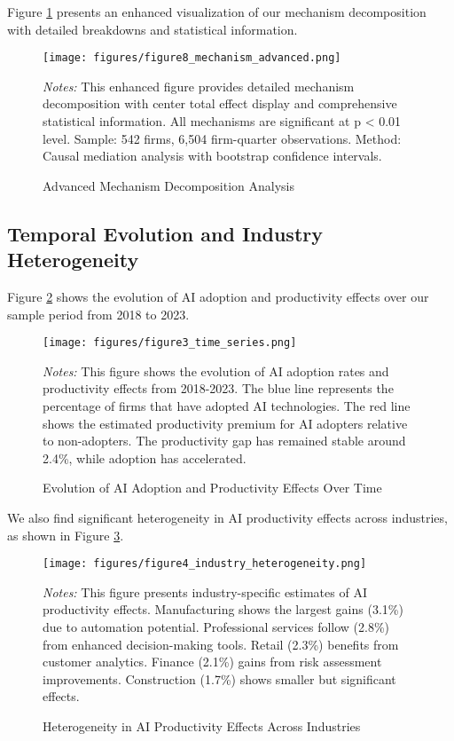 \documentclass[12pt, a4paper]{article}
\begin{document}
Figure \ref{fig:mechanism_advanced} presents an enhanced visualization of our mechanism decomposition with detailed breakdowns and statistical information.

\begin{figure}[H]
\centering
\texttt{[image: figures/figure8\_mechanism\_advanced.png]}
\caption{Advanced Mechanism Decomposition Analysis}
\label{fig:mechanism_advanced}
\begin{minipage}{\textwidth}
\footnotesize
\textit{Notes:} This enhanced figure provides detailed mechanism decomposition with center total effect display and comprehensive statistical information. All mechanisms are significant at p < 0.01 level. Sample: 542 firms, 6,504 firm-quarter observations. Method: Causal mediation analysis with bootstrap confidence intervals.
\end{minipage}
\end{figure}

\subsection{Temporal Evolution and Industry Heterogeneity}

Figure \ref{fig:time_series} shows the evolution of AI adoption and productivity effects over our sample period from 2018 to 2023.

\begin{figure}[H]
\centering
\texttt{[image: figures/figure3\_time\_series.png]}
\caption{Evolution of AI Adoption and Productivity Effects Over Time}
\label{fig:time_series}
\begin{minipage}{\textwidth}
\footnotesize
\textit{Notes:} This figure shows the evolution of AI adoption rates and productivity effects from 2018-2023. The blue line represents the percentage of firms that have adopted AI technologies. The red line shows the estimated productivity premium for AI adopters relative to non-adopters. The productivity gap has remained stable around 2.4\%, while adoption has accelerated.
\end{minipage}
\end{figure}

We also find significant heterogeneity in AI productivity effects across industries, as shown in Figure \ref{fig:industry_heterogeneity}.

\begin{figure}[H]
\centering
\texttt{[image: figures/figure4\_industry\_heterogeneity.png]}
\caption{Heterogeneity in AI Productivity Effects Across Industries}
\label{fig:industry_heterogeneity}
\begin{minipage}{\textwidth}
\footnotesize
\textit{Notes:} This figure presents industry-specific estimates of AI productivity effects. Manufacturing shows the largest gains (3.1\%) due to automation potential. Professional services follow (2.8\%) from enhanced decision-making tools. Retail (2.3\%) benefits from customer analytics. Finance (2.1\%) gains from risk assessment improvements. Construction (1.7\%) shows smaller but significant effects.
\end{minipage}
\end{figure}
\end{document}
